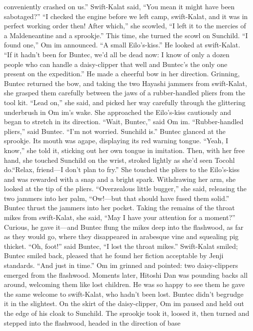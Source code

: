 \documentclass[9pt]{article}
\begin{document}
conveniently crashed on us.”
Swift-Kalat said, “You mean it might have been sabotaged?”
“I checked the engine before we left camp, swift-Kalat, and it was in perfect working order then!
After which,” she scowled, “I left it to the mercies of a Maldeneantine and a sprookje.” This time, she
turned the scowl on Sunchild.
“I found one,” Om im announced. “A small Eilo’s-kiss.” He looked at swift-Kalat. “If it hadn’t been
for Buntec, we’d all be dead now: I know of only a dozen people who can handle a daisy-clipper that
well and Buntec’s the only one present on the expedition.” He made a cheerful bow in her direction.
Grinning, Buntec returned the bow, and taking the two Hayashi jammers from swift-Kalat, she
grasped them carefully between the jaws of a rubber-handled pliers from the tool kit. “Lead on,” she
said, and picked her way carefully through the glittering underbrush in Om im’s wake.
She approached the Eilo’s-kiss cautiously and began to stretch in its direction. “Wait, Buntec,” said
Om im.
“Rubber-handled pliers,” said Buntec.
“I’m not worried. Sunchild is.”
Buntec glanced at the sprookje. Its mouth was agape, displaying its red warning tongue. “Yeah, I
know,” she told it, sticking out her own tongue in imitation.
Then, with her free hand, she touched Sunchild on the wrist, stroked lightly as she’d seen Tocohl do.“Relax, friend—I don’t plan to fry.”
She touched the pliers to the Eilo’s-kiss and was rewarded with a snap and a bright spark.
Withdrawing her arm, she looked at the tip of the pliers. “Overzealous little bugger,” she said, releasing
the two jammers into her palm, “Ow!—but that should have fused them solid.”
Buntec thrust the jammers into her pocket. Taking the remains of the throat mikes from swift-Kalat,
she said, “May I have your attention for a moment?” Curious, he gave it—and Buntec flung the mikes
deep into the flashwood, as far as they would go, where they disappeared in arabesque vine and
squealing pig thicket.
“Oh, foot!” said Buntec, “I lost the throat mikes.”
Swift-Kalat smiled; Buntec smiled back, pleased that he found her fiction acceptable by Jenji
standards.
“And just in time.” Om im grinned and pointed: two daisy-clippers emerged from the flashwood.
Moments later, Hitoshi Dan was pounding backs all around, welcoming them like lost children. He was
so happy to see them he gave the same welcome to swift-Kalat, who hadn’t been lost. Buntec didn’t
begrudge it in the slightest.
On the skirt of the daisy-clipper, Om im paused and held out the edge of his cloak to Sunchild. The
sprookje took it, loosed it, then turned and stepped into the flashwood, headed in the direction of base
\end{document}
